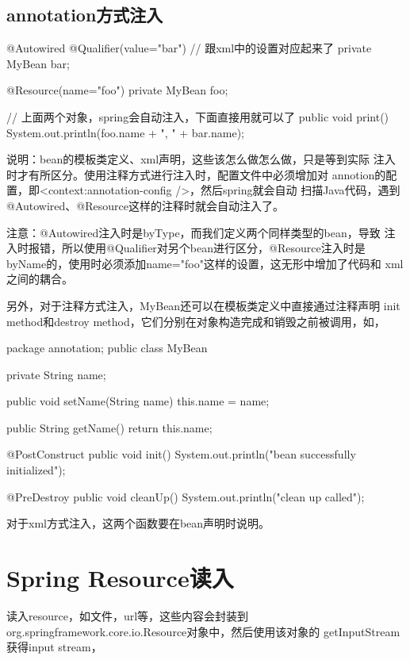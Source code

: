 \documentclass[a4paper,11pt]{article}
\begin{document}
\subsection[annotation方式注入]{annotation方式注入}
\begin{javacode}
  @Autowired
  @Qualifier(value="bar")  // 跟xml中的设置对应起来了
  private MyBean bar;

  @Resource(name="foo")
  private MyBean foo;

  // 上面两个对象，spring会自动注入，下面直接用就可以了
  public void print() {
    System.out.println(foo.name + ", " + bar.name);
  }
\end{javacode}

说明：bean的模板类定义、xml声明，这些该怎么做怎么做，只是等到实际
注入时才有所区分。使用注释方式进行注入时，配置文件中必须增加对
annotion的配置，即<context:annotation-config />，然后spring就会自动
扫描Java代码，遇到@Autowired、@Resource这样的注释时就会自动注入了。

注意：@Autowired注入时是byType，而我们定义两个同样类型的bean，导致
注入时报错，所以使用@Qualifier对另个bean进行区分，@Resource注入时是
byName的，使用时必须添加name="foo"这样的设置，这无形中增加了代码和
xml之间的耦合。

另外，对于注释方式注入，MyBean还可以在模板类定义中直接通过注释声明
init method和destroy method，它们分别在对象构造完成和销毁之前被调用，如，

\begin{javacode}
package annotation;
public class MyBean {
  private String name;

  public void setName(String name) {
    this.name = name;
  }

  public String getName() {
    return this.name;
  }

  @PostConstruct
  public void init() {
    System.out.println("bean successfully initialized");
  }
  
  @PreDestroy
  public void cleanUp() {
    System.out.println("clean up called");
  }
}
\end{javacode}

对于xml方式注入，这两个函数要在bean声明时说明。

\section[Spring Resource读入]{Spring Resource读入}
读入resource，如文件，url等，这些内容会封装到
org.springframework.core.io.Resource对象中，然后使用该对象的
getInputStream获得input stream，
\end{document}
